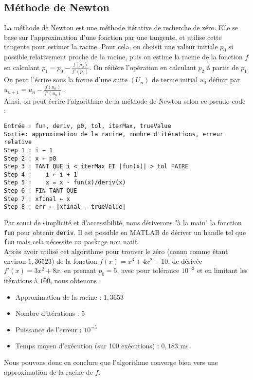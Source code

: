 \documentclass[12pt]{article}
\begin{document}
\subsection{Méthode de Newton}
\label{ref:newton}
\noindent La méthode de Newton est une méthode itérative de recherche de zéro. Elle se base sur l'approximation d'une fonction par une tangente, et utilise cette tangente pour estimer la racine. Pour cela, on choisit une valeur initiale $p_0$ si possible relativement proche de la racine, puis on estime la racine de la fonction $f$ en calculant $p_1=p_0-\frac{f(p_0)}{f'(p_0)}$. On réitère l'opération en calculant $p_2$ à partir de $p_1$. On peut l'écrire sous la forme d'une suite $(U_n)$ de terme initial $u_0$ définir par $u_{n+1}=u_n-\frac{f(u_n)}{f'(u_n)}$.\\
Ainsi, on peut écrire l'algorithme de la méthode de Newton selon ce pseudo-code :
\begin{verbatim}
Entrée : fun, deriv, p0, tol, iterMax, trueValue
Sortie: approximation de la racine, nombre d'itérations, erreur relative
Step 1 : i ← 1
Step 2 : x ← p0
Step 3 : TANT QUE i < iterMax ET |fun(x)| > tol FAIRE
Step 4 :    i ← i + 1
Step 5 :    x = x - fun(x)/deriv(x)
Step 6 : FIN TANT QUE
Step 7 : xfinal ← x
Step 8 : err ← |xfinal - trueValue|
\end{verbatim}
Par souci de simplicité et d'accessibilité, nous dériverons "à la main" la fonction \texttt{fun} pour obtenir \texttt{deriv}. Il est possible en MATLAB de dériver un handle tel que \texttt{fun} mais cela nécessite un package non natif.\\

\noindent Après avoir utilisé cet algorithme pour trouver le zéro (connu comme étant environ $1,36523$) de la fonction $f(x) = x^3 + 4x^2 -10$, de dérivée $f'(x)=3x^2+8x$, en prenant $p_0=5$, avec pour tolérance $10^{-3}$ et en limitant les itérations à $100$, nous obtenons :
\begin{itemize}
    \item Approximation de la racine : $1,3653$
    \item Nombre d'itérations : $5$
    \item Puissance de l'erreur : $10^{-5}$
    \item Temps moyen d'exécution (sur 100 exécutions) : $0,183$ ms
\end{itemize}
Nous pouvons donc en conclure que l'algorithme converge bien vers une approximation de la racine de $f$.

\end{document}

